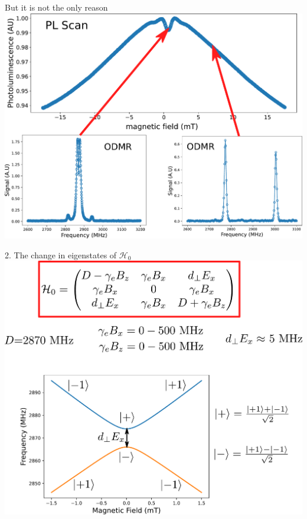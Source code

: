\documentclass{beamer}
\begin{document}
\begin{frame}{But it is not the only reason}
\centering
\includegraphics[width=\textwidth,height=0.9\textheight,keepaspectratio]{scan 100 slide}
\end{frame}
\begin{frame}{2. The change in eigenstates of $\mathcal{H}_0$}
\centering
\includegraphics[width=\textwidth,height=0.9\textheight,keepaspectratio]{Coupled Basis}
\end{frame}
\end{document}
